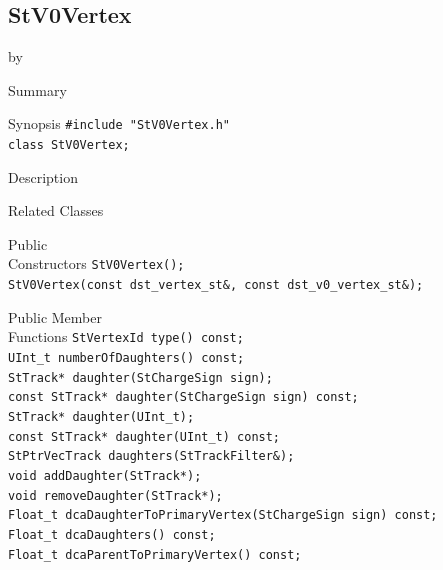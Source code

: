 \documentclass[twoside]{article}
\newcommand{\entrylabel}[1]{\mbox{\textbf{{#1}}}\hfil}%
\newenvironment{entry}
{\begin{list}{}%
    {\renewcommand{\makelabel}{\entrylabel}%
     \setlength{\labelwidth}{90pt}%
     \setlength{\leftmargin}{\labelwidth}
     \advance\leftmargin by \labelsep%
      }%
    }%
  {\end{list}}
\newcommand{\Entrylabel}[1]%
{\raisebox{0pt}[1ex][0pt]{\makebox[\labelwidth][l]%
    {\parbox[t]{\labelwidth}{\hspace{0pt}\textbf{{#1}}}}}}
\newenvironment{Entry}%
{\renewcommand{\entrylabel}{\Entrylabel}\begin{entry}}%
  {\end{entry}}
\begin{document}
\subsection{StV0Vertex}
\label{sec:StV0Vertex}
\begin{Entry}
\item[Summary]
\item[Synopsis]
    \verb+#include "StV0Vertex.h"+\\
    \verb+class StV0Vertex;+\\
\item[Description]
\item[Related Classes]
\item[Public\\ Constructors]
    \verb+StV0Vertex();+\\
    \verb+StV0Vertex(const dst_vertex_st&, const dst_v0_vertex_st&);+\\
\item[Public Member\\ Functions]
    \verb+StVertexId type() const;+\\
    
    \verb+UInt_t numberOfDaughters() const;+\\

    \verb+StTrack* daughter(StChargeSign sign);+\\

    \verb+const StTrack* daughter(StChargeSign sign) const;+\\

    \verb+StTrack* daughter(UInt_t);+\\

    \verb+const StTrack* daughter(UInt_t) const;+\\

    \verb+StPtrVecTrack daughters(StTrackFilter&);+\\

    \verb+void addDaughter(StTrack*);+\\

    \verb+void removeDaughter(StTrack*);+\\

    \verb+Float_t dcaDaughterToPrimaryVertex(StChargeSign sign) const;+\\

    \verb+Float_t dcaDaughters() const;+\\

    \verb+Float_t dcaParentToPrimaryVertex() const;+\\


\end{Entry}
\end{document}
